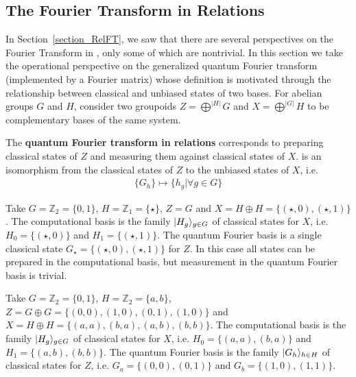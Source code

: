 \subsection{The Fourier Transform in Relations}
\label{sec:RelFT}

In Section~\ref{section_RelFT}, we saw that there are several perspectives on the Fourier Transform in , only some of which are nontrivial. In this section we take the operational perspective on the generalized quantum Fourier transform (implemented by a Fourier matrix) whose definition is motivated through the relationship between classical and unbiased states of two bases.  For abelian groups $G$ and $H$, consider two groupoids $Z=\bigoplus^{|H|}G$ and $X=\bigoplus^{|G|}H$ to be complementary bases of the same system.

\begin{defn}
\label{def:FTRel}
The \textbf{quantum Fourier transform in relations} corresponds to preparing classical states of $Z$ and measuring them against classical states of $X$.
is an isomorphism from the classical states of $Z$ to the unbiased states of $X$, i.e.
\begin{align*}
\{G_h\}\mapsto \{h_g|\forall g\in G\}
\end{align*}
\end{defn}

\begin{example}
Take $G=\mathbb{Z}_2=\{0,1\}$, $H=\mathbb{Z}_1=\{\star\}$, $Z = G$ and $X=H\oplus H = \{ (\star,0),(\star,1) \}$. The computational basis is the family $| H_g \rangle_{g\in G}$ of classical states for $X$, i.e. $H_0 = \{(\star,0)\}$ and $H_1 = \{(\star,1)\}$. The quantum Fourier basis is a single classical state $G_\star = \{(\star,0), (\star,1)\}$ for $Z$. In this case all states can be prepared in the computational basis, but  measurement in the quantum Fourier basis is trivial.
\end{example}

\begin{example}
Take $G=\mathbb{Z}_2=\{0,1\}$, $H=\mathbb{Z}_2=\{a,b\}$, $Z = G \oplus G = \{ (0,0),(1,0),(0,1),(1,0)\}$ and $X= H \oplus H = \{ (a,a), (b,a), (a,b), (b,b) \}$. The computational basis is the family $| H_g \rangle_{g \in G}$ of classical states for $X$, i.e. $H_0 = \{(a,a),(b,a)\}$ and $H_1 = \{(a,b),(b,b)\}$. The quantum Fourier basis is the family $| G_h \rangle_{h\in H}$ of classical states for $Z$, i.e. $G_a = \{(0,0),(0,1)\}$ and $G_b = \{(1,0),(1,1)\}$.
\end{example}

